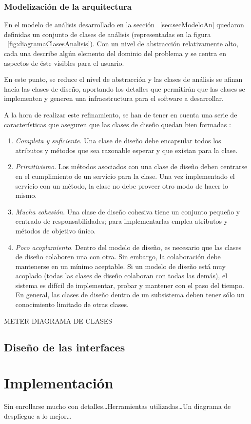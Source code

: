 \subsubsection{Modelización de la arquitectura}

En el modelo de análisis desarrollado en la sección ~\ref{sec:secModeloAn} quedaron definidas un conjunto de clases de análisis (representadas en la figura ~\ref{fig:diagramaClasesAnalisis}). Con un nivel de abstracción relativamente alto, cada una describe algún elemento del dominio del problema y se centra en aspectos de éste visibles para el usuario.

En este punto, se reduce el nivel de abstracción y las clases de análisis se afinan hacía las clases de diseño, aportando los detalles que permitirán que las clases se implementen y generen una infraestructura para el software a desarrollar.

A la hora de realizar este refinamiento, se han de tener en cuenta una serie de características que aseguren que las clases de diseño quedan bien formadas \cite{Arl02}:

\begin{enumerate}
	\item \textit{Completa y suficiente}. Una clase de diseño debe encapsular todos los atributos y métodos que sea razonable esperar y que existan para la clase.
	\item \textit{Primitivismo}. Los métodos asociados con una clase de diseño deben centrarse en el cumplimiento de un servicio para la clase. Una vez implementado el servicio con un método, la
	clase no debe proveer otro modo de hacer lo mismo.
	\item \textit{Mucha cohesión}. Una clase de diseño cohesiva tiene un conjunto pequeño y centrado de	responsabilidades; para implementarlas emplea atributos y métodos de objetivo único.
	\item \textit{Poco acoplamiento}. Dentro del modelo de diseño, es necesario que las clases de diseño colaboren una con otra. Sin embargo, la colaboración debe mantenerse en un mínimo aceptable. Si un modelo de diseño está muy acoplado (todas las clases de diseño colaboran con todas las demás), el sistema es difícil de implementar, probar y mantener con el paso del tiempo. En general, las clases de diseño dentro de un subsistema deben tener sólo un conocimiento limitado de otras clases.
\end{enumerate}

METER DIAGRAMA DE CLASES


\subsection{Diseño de las interfaces}




\section{Implementación}
\label{sec:secModeloImp}

Sin enrollarse mucho con detalles\dots Herramientas utilizadas\dots Un diagrama de despliegue a lo mejor\dots
